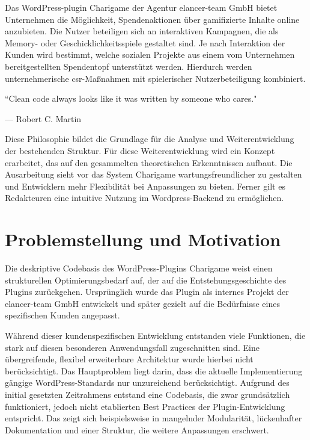 Das WordPress-\gls{plugin} Charigame der Agentur elancer-team GmbH bietet Unternehmen die Möglichkeit, Spendenaktionen über gamifizierte Inhalte online anzubieten.
Die Nutzer beteiligen sich an interaktiven Kampagnen, die als Memory- oder Geschicklichkeitsspiele gestaltet sind.
Je nach Interaktion der Kunden wird bestimmt, welche sozialen Projekte aus einem vom Unternehmen bereitgestellten Spendentopf unterstützt werden.
Hierdurch werden unternehmerische \gls{csr}-Maßnahmen mit spielerischer Nutzerbeteiligung kombiniert.

\epigraph{``Clean code always looks like it was written by someone who cares."}{--- \textup{Robert C. Martin}}

Diese Philosophie bildet die Grundlage für die Analyse und Weiterentwicklung der bestehenden Struktur.
Für diese Weiterentwicklung wird ein Konzept erarbeitet, das auf den gesammelten theoretischen Erkenntnissen aufbaut.
Die Ausarbeitung sieht vor das System Charigame wartungsfreundlicher zu gestalten und Entwicklern mehr Flexibilität bei Anpassungen zu bieten.
Ferner gilt es Redakteuren eine intuitive Nutzung im Wordpress-Backend zu ermöglichen.

\section{Problemstellung und Motivation}

Die deskriptive Codebasis des WordPress-Plugins Charigame weist einen strukturellen Optimierungsbedarf auf, der auf die Entstehungsgeschichte des Plugins zurückgehen.
Ursprünglich wurde das Plugin als internes Projekt der elancer-team GmbH entwickelt und später gezielt auf die Bedürfnisse eines spezifischen Kunden angepasst.

Während dieser kundenspezifischen Entwicklung entstanden viele Funktionen, die stark auf diesen besonderen Anwendungsfall zugeschnitten sind.
Eine übergreifende, flexibel erweiterbare Architektur wurde hierbei nicht berücksichtigt.
Das Hauptproblem liegt darin, dass die aktuelle Implementierung gängige WordPress-Standards nur unzureichend berücksichtigt.
Aufgrund des initial gesetzten Zeitrahmens entstand eine Codebasis, die zwar grundsätzlich funktioniert, jedoch nicht etablierten Best Practices der Plugin-Entwicklung entspricht.
Das zeigt sich beispielsweise in mangelnder Modularität, lückenhafter Dokumentation und einer Struktur, die weitere Anpassungen erschwert.


